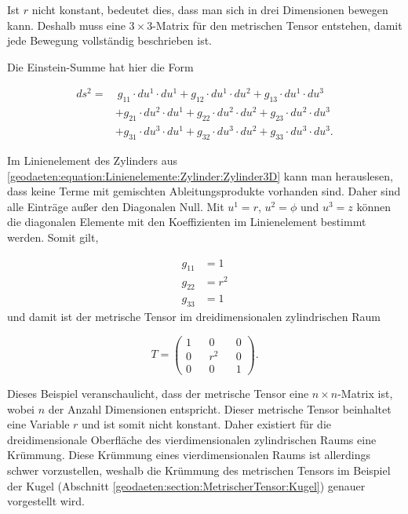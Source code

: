 Ist $r$ nicht konstant, bedeutet dies, dass man sich in drei Dimensionen bewegen kann.
Deshalb muss eine $3 \times 3$-Matrix für den metrischen Tensor entstehen, damit jede Bewegung vollständig beschrieben ist. 

Die Einstein-Summe hat hier die Form

\begin{equation}
\begin{aligned}
	ds^2 = &\ g_{11} \cdot du^1 \cdot du^1 + g_{12} \cdot du^1 \cdot du^2 + g_{13} \cdot du^1 \cdot du^3 \nonumber \\
	&+ g_{21} \cdot du^2 \cdot du^1 + g_{22} \cdot du^2 \cdot du^2 + g_{23} \cdot du^2 \cdot du^3 \nonumber \\
	&+ g_{31} \cdot du^3 \cdot du^1 + g_{32} \cdot du^3 \cdot du^2 + g_{33} \cdot du^3 \cdot du^3  .
\end{aligned} 
	\label{geodaeten:equation:MetrischerTensor:Kartesisch:EinsteinSumme3D}
\end{equation}

Im Linienelement des Zylinders aus \eqref{geodaeten:equation:Linienelemente:Zylinder:Zylinder3D} kann man herauslesen, dass keine Terme mit gemischten Ableitungsprodukte vorhanden sind.
Daher sind alle Einträge außer den Diagonalen Null.
Mit $u^1 = r$, $u^2 = \phi$ und $u^3 = z$  können die diagonalen Elemente mit den Koeffizienten im Linienelement bestimmt werden. 
Somit gilt,

\begin{equation}
	\begin{aligned}
		g_{11}  &= 1  \\
		g_{22}  &= r^2 \\
		g_{33}  &= 1  
	\end{aligned}
\end{equation}
und damit ist der metrische Tensor im dreidimensionalen zylindrischen Raum

\begin{equation}
	T = \begin{pmatrix} 1 && 0 && 0 \\ 0 && r^2 && 0 \\ 0 && 0 && 1 \end{pmatrix} .
\end{equation}

Dieses Beispiel veranschaulicht, dass der metrische Tensor eine $n \times n$-Matrix ist, wobei $n$ der Anzahl Dimensionen entspricht.
Dieser metrische Tensor beinhaltet eine Variable $r$ und ist somit nicht konstant. 
Daher existiert für die dreidimensionale Oberfläche des vierdimensionalen zylindrischen Raums eine Krümmung.
Diese Krümmung eines vierdimensionalen Raums ist allerdings schwer vorzustellen, weshalb die Krümmung des metrischen Tensors im Beispiel der Kugel (Abschnitt \ref{geodaeten:section:MetrischerTensor:Kugel}) genauer vorgestellt wird.
